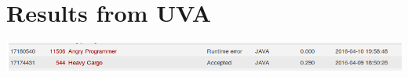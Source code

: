 \documentclass[12pt]{article}
\begin{document}

\newcommand{\hmwkClass}{COS 255}
\newcommand{\hmwkSemester}{Spring 2016}

\newcommand{\hmwkAuthorName}{Lukas Leung}
\newcommand{\hmwkAuthorID}{lleung}

\newcommand{\hmwkAssignmentNum}{6}

\newcommand{\hmwkProblemNum}{0}

\newcommand{\hmwkCollaborators}{}
\thispagestyle{fancycollab}

\section*{Results from UVA}
\includegraphics[width=\textwidth]{results}
\newpage

\end{document}
